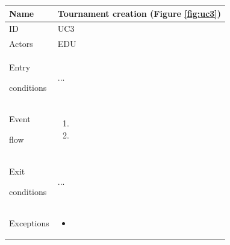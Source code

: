 \begin{center}
    \def\arraystretch{1.5}
    \begin{tabular}{| m{2cm} | m{10cm}|}
        \hline
        Name                  & Tournament creation  (Figure \ref{fig:uc3})                                                                                                               \\ \hline
        ID                    & UC3                                                                                                                             \\ \hline
        Actors                & EDU                                                                                                                             \\ \hline
        Entry \par conditions & ... \\ \hline
        Event \par flow       & \begin{enumerate}
                                    \item 
                                    \item 
                                \end{enumerate} \\ \hline
        Exit \par conditions  & ... \\ \hline
        Exceptions            & \begin{itemize}
                                    \item 
                                \end{itemize} \\ \hline
    \end{tabular}
\end{center}

